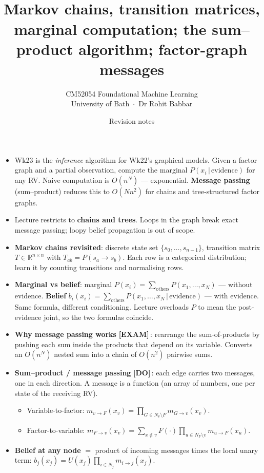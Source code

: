 \documentclass[11pt, a4paper]{article}
\title{\vspace{-1cm}{\Huge\bfseries Week 23 — Message Passing in Graphical Models} \\[0.4em]{\large Markov chains, transition matrices, marginal computation; the sum--product algorithm; factor-graph messages}}
\author{\large CM52054 Foundational Machine Learning \\[0.2em]\normalsize University of Bath \,$\cdot$\, Dr Rohit Babbar}
\date{Revision notes}
\newcommand{\examflag}{\textcolor{tipBd}{\textbf{[EXAM]}}\,}
\newcommand{\doflag}{\textcolor{defBd}{\textbf{[DO]}}\,}
\begin{document}
\maketitle\thispagestyle{empty}\vspace{1em}

\begin{tldrbox}
\begin{itemize}[leftmargin=*]
  \item Wk23 is the \emph{inference} algorithm for Wk22's graphical models. Given a factor graph and a partial observation, compute the marginal $P(x_i\,|\,\text{evidence})$ for any RV. Naive computation is $O(n^N)$ — exponential. \textbf{Message passing} (sum--product) reduces this to $O(N n^2)$ for chains and tree-structured factor graphs.
  \item Lecture restricts to \textbf{chains and trees}. Loops in the graph break exact message passing; loopy belief propagation is out of scope.
  \item \textbf{Markov chains revisited}: discrete state set $\{s_0, \ldots, s_{n-1}\}$, transition matrix $T \in \mathbb{R}^{n\times n}$ with $T_{ab} = P(s_a \to s_b)$. Each row is a categorical distribution; learn it by counting transitions and normalising rows.
  \item \textbf{Marginal vs belief}: marginal $P(x_i) = \sum_{\text{others}} P(x_1, \ldots, x_N)$ — without evidence. \textbf{Belief} $b_i(x_i) = \sum_{\text{others}} P(x_1, \ldots, x_N\,|\,\text{evidence})$ — with evidence. Same formula, different conditioning. Lecture overloads $P$ to mean the post-evidence joint, so the two formulas coincide.
  \item \textbf{Why message passing works} \examflag{}: rearrange the sum-of-products by pushing each sum inside the products that depend on its variable. Converts an $O(n^N)$ nested sum into a chain of $O(n^2)$ pairwise sums.
  \item \textbf{Sum--product / message passing} \doflag{}: each edge carries two messages, one in each direction. A message is a function (an array of numbers, one per state of the receiving RV).
  \begin{itemize}
    \item Variable-to-factor: $m_{v\to F}(x_v) = \prod_{G\in N_v\setminus F} m_{G\to v}(x_v)$.
    \item Factor-to-variable: $m_{F\to v}(x_v) = \sum_{x \notin v} F(\cdot)\prod_{u\in N_F\setminus v} m_{u\to F}(x_u)$.
  \end{itemize}
  \item \textbf{Belief at any node} $=$ product of incoming messages times the local unary term: $b_j(x_j) = U(x_j)\prod_{i\in N_j} m_{i\to j}(x_j)$.

\end{itemize}
\end{tldrbox}
\end{document}
